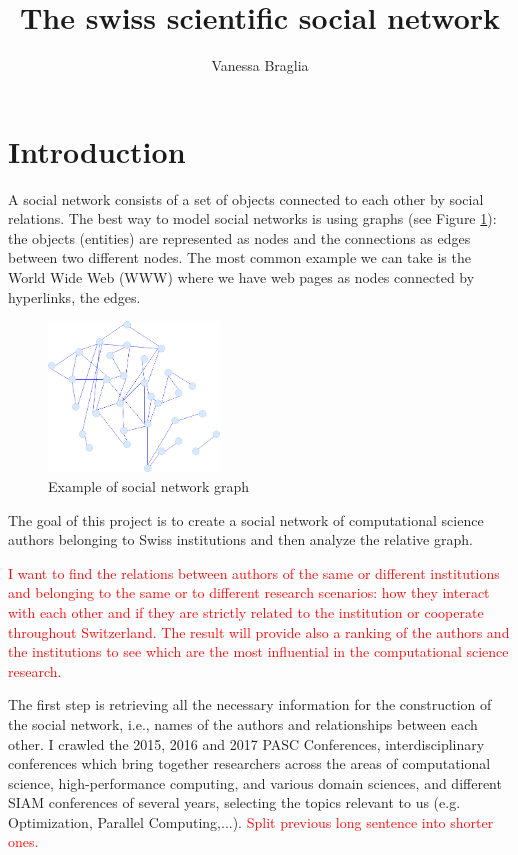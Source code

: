 \documentclass[]{usiinfbachelorproject}
\author{Vanessa Braglia}
\title{The swiss scientific social network}
\begin{document}
\newpage
\tableofcontents
\newpage

\section{Introduction} \label{sec:intro} 

A social network consists of a set of objects connected to each other by social relations. The best way to model social networks is using graphs (see Figure \ref{fig:socialnetwork}): the objects (entities) are represented as nodes and the connections as edges between two different nodes. The most common example we can take is the World Wide Web (WWW) where we have web pages as nodes connected by hyperlinks, the edges.

\begin{figure}[ht]
	\centering
	\includegraphics[height=4cm]{img/graph3.png}
	\caption{Example of social network graph}
	\label{fig:socialnetwork}
\end{figure}

The goal of this project is to create a social network of computational science authors belonging to Swiss institutions and then analyze the relative graph.

\textcolor{red}{I want to find the relations between authors of the same or different institutions and belonging to the same or to different research scenarios: how they interact with each other and if they are strictly related to the institution or cooperate throughout Switzerland. The result will provide also a ranking of the authors and the institutions to see which are the most influential in the computational science research.}

The first step is retrieving all the necessary information for the construction of the social network, i.e., names of the authors and relationships between each other. I crawled the 2015, 2016 and 2017 PASC Conferences, interdisciplinary conferences which bring together researchers across the areas of computational science, high-performance computing, and various domain sciences, and different SIAM conferences of several years, selecting the topics relevant to us (e.g. Optimization, Parallel Computing,...).
\textcolor{red}{Split previous long sentence into shorter ones.}
\end{document}
